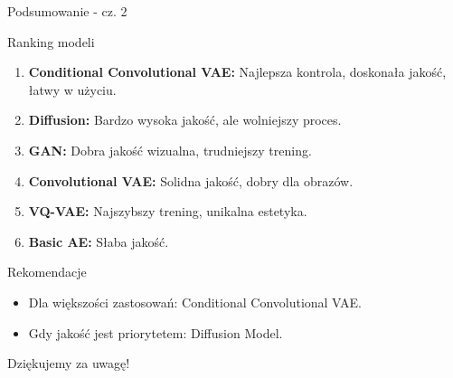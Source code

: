 \documentclass{beamer}
\begin{document}
\begin{frame}{Podsumowanie - cz. 2}
    \begin{block}{Ranking modeli}
        \begin{enumerate}
            \item \textbf{Conditional Convolutional VAE:} Najlepsza kontrola, doskonała jakość, łatwy w użyciu.
            \item \textbf{Diffusion:} Bardzo wysoka jakość, ale wolniejszy proces.
            \item \textbf{GAN:} Dobra jakość wizualna, trudniejszy trening.
            \item \textbf{Convolutional VAE:} Solidna jakość, dobry dla obrazów.
            \item \textbf{VQ-VAE:} Najszybszy trening, unikalna estetyka.
            \item \textbf{Basic AE:} Słaba jakość.
        \end{enumerate}
    \end{block}

    \begin{block}{Rekomendacje}
        \begin{itemize}
            \item Dla większości zastosowań: Conditional Convolutional VAE.
            \item Gdy jakość jest priorytetem: Diffusion Model.
        \end{itemize}
    \end{block}

\end{frame}

\begin{frame}
    \centering
    \Huge Dziękujemy za uwagę!
\end{frame}
\end{document}
